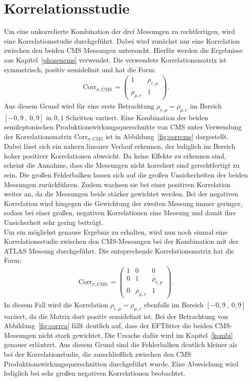 \section{Korrelationsstudie}
Um eine unkorrelierte Kombination der drei Messungen zu rechtfertigen, wird eine Korrelationsstudie durchgeführt. Dabei wird zunächst nur eine Korrelation zwischen den beiden CMS Messungen untersucht. Hierfür werden die Ergebnisse aus Kapitel~\ref{phasencms} verwendet. Die verwendete Korrelationsmatrix ist symmetrisch, positiv semidefinit und hat die Form:
\begin{align}
  \text{Corr}_{\sigma,\text{CMS}}\,=\begin{pmatrix}
  1 & \rho_{e, \mu}\\
  \rho_{\mu, e} & 1
  \end{pmatrix}.
  \label{eqn:matrix1}
\end{align}
Aus diesem Grund wird für eine erste Betrachtung $\rho_{e, \mu}= \rho_{\mu, e}$ im Bereich $[-0,9~,~0,9]$ in $0,1$ Schritten variiert. Eine Kombination der beiden semileptonischen Produktionswirkungsquerschnitte von CMS unter Verwendung der Korrelationsmatrix $\text{Corr}_{\sigma,\text{CMS}}$ ist in Abbildung~\ref{fig:corrcms} dargestellt. Dabei lässt sich ein nahezu linearer Verlauf erkennen, der lediglich im Bereich hoher positiver Korrelationen abweicht. Da keine Effekte zu erkennen sind, scheint die Annahme, dass die Messungen nicht korreliert sind gerechtfertigt zu sein. Die großen Fehlerbalken lassen sich auf die großen Unsicherheiten der beiden Messungen zurückführen. Zudem wachsen sie bei einer positiven Korrelation weiter an, da die Messungen beide stärker gewichtet werden. Bei der negativen Korrelation wird hingegen die Gewichtung der zweiten Messung immer geringer, sodass bei einer großen, negativen Korrelationen eine Messung und damit ihre Unsicherheit sehr gering beiträgt.\\
Um ein möglichst genaues Ergebnis zu erhalten, wird nun noch einmal eine Korrelationsstudie zwischen den CMS-Messungen bei der Kombination mit der ATLAS Messung durchgeführt. Die entsprechende Korrelationsmatrix hat die Form:
\begin{align}
  \text{Corr}_{\sigma,\text{CMS}}\,=\begin{pmatrix}
  1 & 0 & 0\\
  0 & 1 &\rho_{e, \mu}\\
  0 & \rho_{\mu, e} & 1
  \end{pmatrix}.
  \label{eqn:matrix2}
\end{align}
In diesem Fall wird die Korrelation $\rho_{e, \mu}= \rho_{\mu, e}$ ebenfalls im Bereich $[-0,9~,~0,9]$ variiert, da die Matrix dort positiv semidefinit ist. Bei der Betrachtung von Abbildung~\ref{fig:corrca} fällt deutlich auf, dass der EFTfitter die beiden CMS-Messungen nicht stark gewichtet. Die Ursache dafür wird im Kapitel~\ref{kombi} genauer erläutert. Aus diesem Grund sind die Fehlerbalken deutlich kleiner als bei der Korrelationstudie, die ausschließlich zwischen den CMS Produktionswirkungsquerschnitten durchgeführt wurde. Eine Abweichung wird lediglich bei sehr großen negativen Korrelationen beobachtet.
